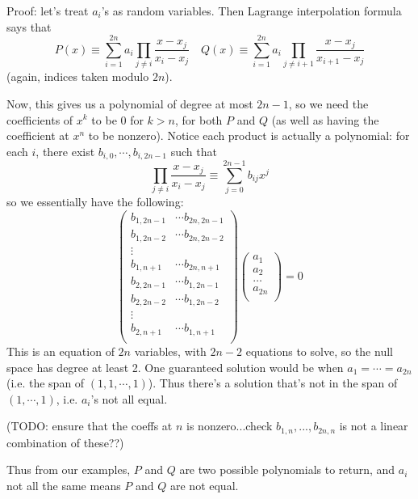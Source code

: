 \documentclass[11pt,a4paper]{article}
\begin{document}
\begin{enumerate}
	Proof: let's treat $a_i$'s as random variables. 
	Then Lagrange interpolation formula says that 
	\[
	P(x)\equiv \sum_{i=1}^{2n} a_i \prod_{j\neq i}\frac{x-x_j}{x_i-x_j}
	\quad 
	Q(x)\equiv \sum_{i=1}^{2n} a_i \prod_{j\neq i+1}\frac{x-x_j}{x_{i+1}-x_j}
	\]
	(again, indices taken modulo $2n$). 
	
	Now, this gives us a polynomial of degree at most $2n-1$, so we need the coefficients of $x^k$ to be 0 for $k>n$, for both $P$ and $Q$ (as well as having the coefficient at $x^n$ to be nonzero). 
	Notice each product is actually a polynomial: for each $i$, there exist $b_{i, 0}, \cdots, b_{i, 2n-1}$ such that 
	\[
	\prod_{j\neq i}\frac{x-x_j}{x_i-x_j}\equiv \sum_{j=0}^{2n-1}b_{ij}x^j
	\]
	so we essentially have the following: 
	\[
	\begin{pmatrix}
	  b_{1, 2n-1} & \cdots b_{2n, 2n-1}\\
	  b_{1, 2n-2} & \cdots b_{2n, 2n-2}\\
	  \vdots \\
	  b_{1, n+1} & \cdots b_{2n, n+1}\\
	  b_{2, 2n-1} & \cdots b_{1, 2n-1}\\
	  b_{2, 2n-2} & \cdots b_{1, 2n-2}\\
	  \vdots \\
	  b_{2, n+1} & \cdots b_{1, n+1}\\
	\end{pmatrix}
	\begin{pmatrix}
	  a_1\\a_2\\ \ldots\\ a_{2n}\\
	\end{pmatrix}
	=0
	\]
	This is an equation of $2n$ variables, with $2n-2$ equations to solve, so the null space has degree at least 2. 
	One guaranteed solution would be when $a_1=\cdots = a_{2n}$ (i.e. the span of $(1, 1, \cdots, 1)$). 
	Thus there's a solution that's not in the span of $(1, \cdots, 1)$, 
	i.e. $a_i$'s not all equal. 
	
	(TODO: ensure that the coeffs at $n$ is nonzero...check $b_{1, n}, ..., b_{2n, n}$ is not a linear combination of these??)
	
	Thus from our examples, $P$ and $Q$ are two possible polynomials to return, and $a_i$ not all the same means $P$ and $Q$ are not equal. 

\end{enumerate}
\end{document}
